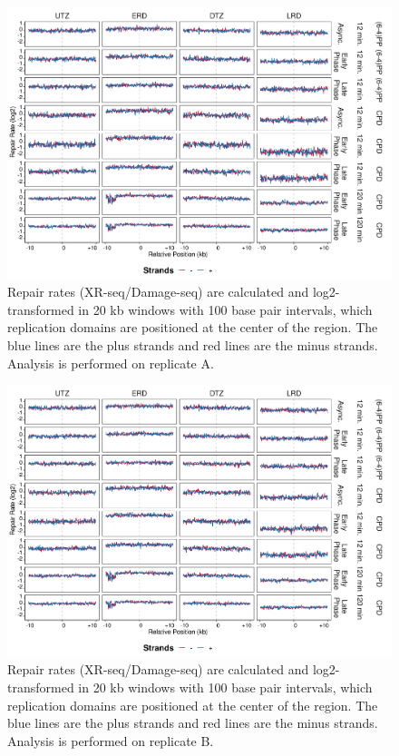 \begin{figure}[H]
\begin{center}
\includegraphics[width=\textwidth]{Chapters/7_appendix/figures/supfig18}
\caption[Repair rates of replication domains in 20 kb (replicate A).]{Repair rates (XR-seq/Damage-seq) are calculated and log2-transformed in 20 kb windows with 100 base pair intervals, which replication domains are positioned at the center of the region. The blue lines are the plus strands and red lines are the minus strands. Analysis is performed on replicate A.}
\label{supfig:repairrate20repdomainA}
\end{center}
\end{figure}

\begin{figure}[H]
\begin{center}
\includegraphics[width=\textwidth]{Chapters/7_appendix/figures/supfig19}
\caption[Repair rates of replication domains in 20 kb (replicate B).]{Repair rates (XR-seq/Damage-seq) are calculated and log2-transformed in 20 kb windows with 100 base pair intervals, which replication domains are positioned at the center of the region. The blue lines are the plus strands and red lines are the minus strands. Analysis is performed on replicate B.}
\label{supfig:repairrate20repdomainB}
\end{center}
\end{figure}

